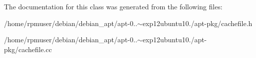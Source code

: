 \-The documentation for this class was generated from the following files\-:\begin{DoxyCompactItemize}
\item 
/home/rpmuser/debian/debian\-\_\-apt/apt-\/0..$\sim$exp12ubuntu10./apt-\/pkg/cachefile.\-h\item 
/home/rpmuser/debian/debian\-\_\-apt/apt-\/0..$\sim$exp12ubuntu10./apt-\/pkg/cachefile.\-cc\end{DoxyCompactItemize}
